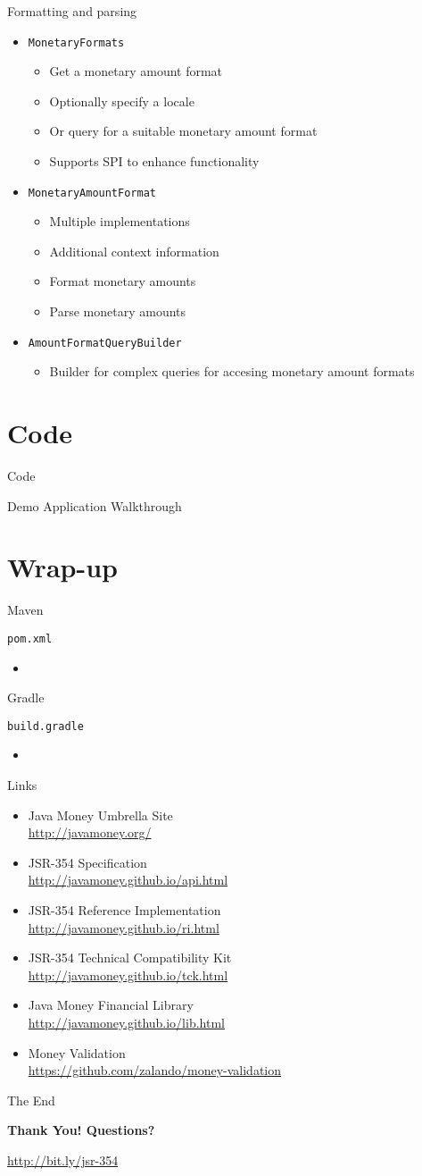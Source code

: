 \documentclass{beamer}
\newcommand{\code}[1]{\texttt{#1}}
\newcommand{\listing}[1]{
	\begin{itemize}
		\item[]
	\end{itemize}
}
\newcommand{\bb}[1]{\textbf{#1}}
\newcommand{\slideItems}[1]{
	\begin{itemize}
		#1
	\end{itemize}
}
\newcommand{\slide}[2]{
	\begin{frame}{#1}
		#2
	\end{frame}
}
\begin{document}
\slide{Formatting and parsing}{
	\slideItems{
		\item \code{MonetaryFormats}
			\slideItems{
				\item Get a monetary amount format
				\item Optionally specify a locale
				\item Or query for a suitable monetary amount format
				\item Supports SPI to enhance functionality
			}
		\item \code{MonetaryAmountFormat}
			\slideItems{
				\item Multiple implementations
				\item Additional context information
				\item Format monetary amounts
				\item Parse monetary amounts
			}
		\item \code{AmountFormatQueryBuilder}
			\slideItems{
				\item Builder for complex queries for accesing monetary amount formats
			}
	}
}

\section{Code}

\slide{}{
	\begin{center}
		\huge{Code}
	
		\large{Demo Application Walkthrough}
	\end{center}
}

\section{Wrap-up}

\slide{Maven}{
	\code{pom.xml}
	\listing{pom.xml}
}

\slide{Gradle}{
	\code{build.gradle}
	\listing{build.gradle}
}

\slide{Links}{
	\slideItems{
		\item Java Money Umbrella Site \\ \url{http://javamoney.org/}
		\item JSR-354 Specification \\ \url{http://javamoney.github.io/api.html}
		\item JSR-354 Reference Implementation \\ \url{http://javamoney.github.io/ri.html}
		\item JSR-354 Technical Compatibility Kit \\ \url{http://javamoney.github.io/tck.html}
		\item Java Money Financial Library \\ \url{http://javamoney.github.io/lib.html}
		\item Money Validation \\ \url{https://github.com/zalando/money-validation}
	}
}

\slide{The End}{
	\begin{center}
		\begin{huge}\bb{Thank You! Questions?}\end{huge}
		
		\qrcode[hyperlink,height=5cm]{http://bit.ly/jsr-354}
		
		\url{http://bit.ly/jsr-354}
	\end{center}
}
\end{document}
